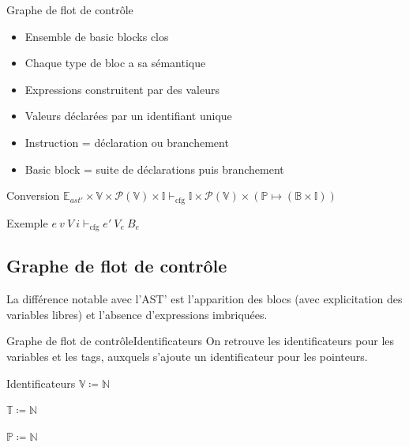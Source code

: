 \documentclass{beamer}
\begin{document}

\begin{frame}{Graphe de flot de contrôle}
    \begin{itemize}
        \item Ensemble de basic blocks \alert{clos}
        \item Chaque type de bloc a sa sémantique
        \item Expressions construitent par des valeurs
        \item Valeurs déclarées par un identifiant unique
        \item Instruction = déclaration ou branchement
        \item Basic block = suite de déclarations puis branchement
    \end{itemize}
    \begin{block}{Conversion}
        $\mathbb{E}_{ast'} \times \mathbb{V} \times \mathcal{P}(\mathbb{V}) \times \mathbb{I} \vdash_{\text{cfg}} \mathbb{I} \times \mathcal{P}(\mathbb{V}) \times (\mathbb{P} \mapsto (\mathbb{B} \times \mathbb{I}))$
    \end{block}
    \begin{exampleblock}{Exemple}
        $e ~ v ~ V ~ i \vdash_{\text{cfg}} e' ~ V_e ~ B_e$
    \end{exampleblock}
\end{frame}


\iffalse
\subsection{Graphe de flot de contrôle}

La différence notable avec l'AST' est l'apparition des blocs (avec explicitation des variables libres) et l'absence d'expressions imbriquées.

\begin{frame}{Graphe de flot de contrôle}{Identificateurs}
    On retrouve les identificateurs pour les variables et les tags, auxquels s'ajoute un identificateur pour les pointeurs.
    
    \begin{block}{Identificateurs}
        $\mathbb{V} \coloneqq \mathbb{N}$%

        $\mathbb{T} \coloneqq \mathbb{N}$%

        $\mathbb{P} \coloneqq \mathbb{N}$%
    \end{block}
\end{frame}
\end{document}
